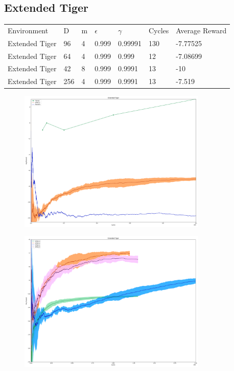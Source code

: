 \documentclass{article}
\theoremstyle{definition}
\newtheorem{primary statistics}[definition]{Primary Statistics}
\newtheorem{auxiliary statistics}[definition]{Auxiliary Statistics}
\begin{document}
\newpage

\subsection{Extended Tiger}
 \begin{tabular}{lllllll}
  \centering
Environment    & D & m & $\epsilon$ & $\gamma$ & Cycles & Average Reward \\
Extended Tiger & 96        & 4           & 0.999       & 0.99991           & 130    & -7.77525        \\
Extended Tiger & 64        & 4           & 0.999       & 0.999             & 12     & -7.08699       \\
Extended Tiger & 42        & 8           & 0.999       & 0.9991            & 13     & -10             \\
Extended Tiger & 256       & 4           & 0.999       & 0.9991            & 13     & -7.519       
\end{tabular}

 \begin{figure}[h]
 \centering
    \includegraphics[width=9cm]{RvVvU_Extended_Tiger}
\end{figure}

 \begin{figure}[h]
 \centering
    \includegraphics[width=9cm]{BT_Extended_Tiger}
\end{figure}
\end{document}
